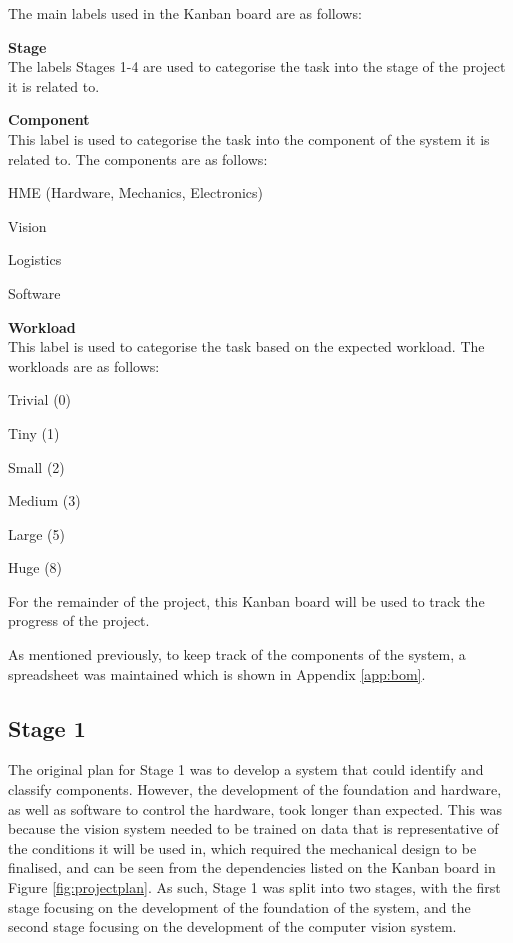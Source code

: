 \noindent
The main labels used in the Kanban board are as follows:
\begin{mylist}
  \item \textbf{Stage} \\
  The labels Stages 1-4 are used to categorise the task into the stage of the project it is related to.
  \item \textbf{Component} \\
  This label is used to categorise the task into the component of the system it is related to. The components are as follows:
  \begin{mylist}
    \item HME (Hardware, Mechanics, Electronics)
    \item Vision
    \item Logistics
    \item Software
  \end{mylist}
  \item \textbf{Workload} \\
  This label is used to categorise the task based on the expected workload. The workloads are as follows:
  \begin{multicols}{2}
    \vspace{-0.5em} 
    \begin{mylist}
      \item Trivial (0)
      \item Tiny (1)
      \item Small (2)
      \item Medium (3)
      \item Large (5)
      \item Huge (8)
    \end{mylist}
    \vspace{-0.5em} 
  \end{multicols}
\end{mylist}

For the remainder of the project, this Kanban board will be used to track the progress of the project. 

As mentioned previously, to keep track of the components of the system, a spreadsheet was maintained which is shown in Appendix \ref{app:bom}.
\subsection{Stage 1}
The original plan for Stage 1 was to develop a system that could identify and classify components. However, the development 
of the foundation and hardware, as well as software to control the hardware, took longer than expected. This was because
the vision system needed to be trained on data that is representative of the conditions it will be used in, which 
required the mechanical design to be finalised, and can be seen from the dependencies listed on the Kanban board in Figure \ref{fig:projectplan}.
As such, Stage 1 was split into two stages, with the first stage focusing on the development of the foundation of the system, and the second stage focusing on the development of the computer vision system.


